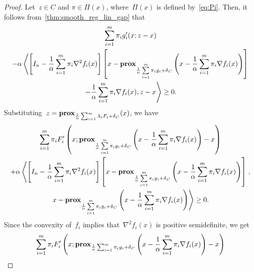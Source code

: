 \documentclass[../../main]{subfiles}
\begin{document}
                        \begin{proof}
                            Let~$z \in C$ and $\pi \in \Pi(x)$, where~$\Pi(x)$ is defined by~\cref{eq:Pi}.
                            Then, it follows from~\cref{thm:smooth_reg_lin_gap} that
                            \begin{multline}
                                \sum_{i = 1}^{m} \pi_i g_i'(x; z - x) \\
                                - \alpha \left\langle \left[ I_n - \frac{1}{\alpha} \sum_{i = 1}^{m} \pi_i \nabla^2 f_i(x) \right] \left[x - \operatorname{\mathbf{prox}}_{\frac{1}{\alpha} \sum\limits_{i = 1}^{m} \pi_i g_i + \operatorname{\delta}_C} \left( x - \frac{1}{\alpha} \sum_{i = 1}^{m} \pi_i \nabla f_i(x) \right) \right] \right.\\
                                \left. - \frac{1}{\alpha} \sum_{i = 1}^{m} \pi_i \nabla f_i(x) , z - x \right\rangle \ge 0
                            .\end{multline}
                            Substituting~$z = \operatorname{\mathbf{prox}}_{\frac{1}{\alpha} \sum_{i = 1}^{m} \lambda_i F_i + \operatorname{\delta}_C}(x)$, we have
                            \begin{multline}
                                \sum_{i = 1}^{m} \pi_i F_i' \left(x; \operatorname{\mathbf{prox}}_{\frac{1}{\alpha} \sum\limits_{i = 1}^{m} \pi_i g_i + \operatorname{\delta}_C}\left( x - \frac{1}{\alpha} \sum_{i = 1}^{m} \pi_i \nabla f_i(x) \right) - x \right) \\
                                + \alpha \left\langle \left[ I_n - \frac{1}{\alpha} \sum_{i = 1}^{m} \pi_i \nabla^2 f_i(x) \right] \left[ x - \operatorname{\mathbf{prox}}_{\frac{1}{\alpha} \sum\limits_{i = 1}^{m} \pi_i g_i + \operatorname{\delta}_C}\left( x - \frac{1}{\alpha} \sum_{i = 1}^{m} \pi_i \nabla f_i(x) \right) \right]  \right. , \\
                                \left. x - \operatorname{\mathbf{prox}}_{\frac{1}{\alpha} \sum\limits_{i = 1}^{m} \pi_i g_i + \operatorname{\delta}_C}\left( x - \frac{1}{\alpha} \sum_{i = 1}^{m} \pi_i \nabla f_i(x) \right) \right\rangle \ge 0
                            .\end{multline}
                            Since the convexity of~$f_i$ implies that~$\nabla^2 f_i(x)$ is positive semidefinite, we get
                            \begin{multline}
                                \sum_{i = 1}^{m} \pi_i F_i' \left(x; \prox_{\frac{1}{\alpha} \sum_{i = 1}^{m} \pi_i g_i + \indicator_C}\left( x - \frac{1}{\alpha} \sum_{i = 1}^{m} \pi_i \nabla f_i(x) \right) - x \right) \\

\end{multline}
\end{proof}
\end{document}
